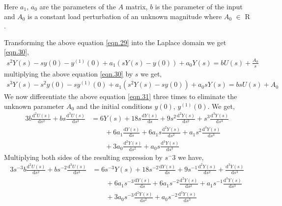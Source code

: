 \documentclass{article}
\begin{document}
Here $a_{1}$, $a_{0}$ are the parameters of the $A$ matrix, $b$ is the parameter of the input and $A_{0}$ is a constant load perturbation of an unknown magnitude where $A_{0}$ $\in$ $\mathrm{R}$.
\par Transforming the above equation \eqref{eqn.29} into the Laplace domain we get \eqref{eqn.30},
\begin{equation}\label{eqn.30}
\begin{split}
s^2Y(s) - sy(0) - y^{(1)}(0) + a_{1}(sY(s)-y(0)) + a_{0}Y(s) = b U(s) + \frac{A_{0}}{s}
\end{split}
\end{equation}
multiplying the above equation \eqref{eqn.30} by $s$ we get,
\begin{equation}\label{eqn.31}
\begin{split}
s^3Y(s) - s^2y(0) - sy^{(1)}(0) + a_{1}(s^2Y(s)-sy(0)) + a_{0}sY(s) = bsU(s) + A_{0}
\end{split}
\end{equation}
We now differentiate the above equation \eqref{eqn.31} three times to eliminate the unknown parameter $A_{0}$ and the initial conditions $y(0)$, $y^{(1)}(0)$. We get,
\begin{equation}\label{eqn.32}
\begin{split}
3b\frac{\mathrm{d}^2U(s)}{\mathrm{d}s^2} + bs\frac{\mathrm{d}^3U(s)}{\mathrm{d}s^3} & = 6Y(s) + 18s\frac{\mathrm{d}Y(s)}{\mathrm{d}s} + 9s^2\frac{\mathrm{d}^2Y(s)}{\mathrm{d}s^2} + s^3\frac{\mathrm{d}^3Y(s)}{\mathrm{d}s^3} \, \\
&\qquad{}+ 6a_{1}\frac{\mathrm{d}Y(s)}{\mathrm{d}s} + 6a_{1}s\frac{\mathrm{d}^2Y(s)}{\mathrm{d}s^2} + a_{1}s^2\frac{\mathrm{d}^3Y(s)}{\mathrm{d}s^3}\, \\ 
&\qquad{}+ 3a_{0}\frac{\mathrm{d}^2Y(s)}{\mathrm{d}s^2} + a_{0}s\frac{\mathrm{d}^3Y(s)}{\mathrm{d}s^3}
\end{split}
\end{equation}
Multiplying both sides of the resulting expression by $s^-3$ we have,
\begin{equation}\label{eqn.33}
\begin{split}
3s^{-3}b\frac{\mathrm{d}^2U(s)}{\mathrm{d}s^2} + bs^{-2}\frac{\mathrm{d}^3U(s)}{\mathrm{d}s^3} & = 6s^{-3}Y(s) + 18s^{-2}\frac{\mathrm{d}Y(s)}{\mathrm{d}s} + 9s^{-1}\frac{\mathrm{d}^2Y(s)}{\mathrm{d}s^2} + \frac{\mathrm{d}^3Y(s)}{\mathrm{d}s^3} \, \\
&\qquad{}+ 6a_{1}s^{-3}\frac{\mathrm{d}Y(s)}{\mathrm{d}s} + 6a_{1}s^{-2}\frac{\mathrm{d}^2Y(s)}{\mathrm{d}s^2} + a_{1}s^{-1}\frac{\mathrm{d}^3Y(s)}{\mathrm{d}s^3} \, \\ &\qquad{}+ 3a_{0}s^{-3}\frac{\mathrm{d}^2Y(s)}{\mathrm{d}s^2} + a_{0}s^{-2}\frac{\mathrm{d}^3Y(s)}{\mathrm{d}s^3}
\end{split}
\end{equation}
\end{document}
